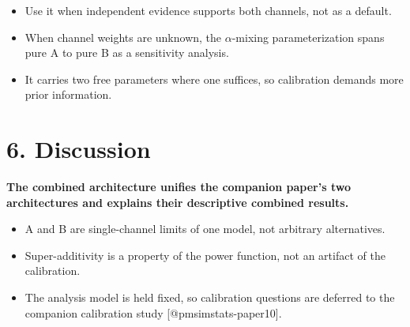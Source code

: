 \documentclass[
  11pt,
]{article}
\begin{document}
\begin{itemize}\setlength{\itemsep}{2pt}\setlength{\parskip}{0pt}
\item Use it when independent evidence supports both channels, not
  as a default.
\item When channel weights are unknown, the $\alpha$-mixing
  parameterization spans pure A to pure B as a sensitivity analysis.
\item It carries two free parameters where one suffices, so
  calibration demands more prior information.
\end{itemize}

\section{6. Discussion}

\textbf{The combined architecture unifies the companion paper's two
architectures and explains their descriptive combined results.}

\begin{itemize}\setlength{\itemsep}{2pt}\setlength{\parskip}{0pt}
\item A and B are single-channel limits of one model, not arbitrary
  alternatives.
\item Super-additivity is a property of the power function, not an
  artifact of the calibration.
\item The analysis model is held fixed, so calibration questions are
  deferred to the companion calibration study [@pmsimstats-paper10].
\end{itemize}
\end{document}
